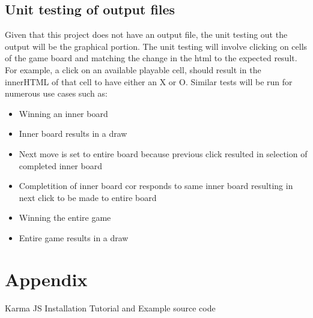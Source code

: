 \documentclass[12pt, titlepage]{article}
\begin{document}
\subsection{Unit testing of output files}		
Given that this project does not have an output file, the unit testing out the output will be the graphical portion. The unit testing will involve clicking on cells of the game board and matching the change in the html to the expected result. For example, a click on an available playable cell, should result in the innerHTML of that cell to have either an X or O. Similar tests will be run for numerous use cases such as:
\begin{itemize}
\item
Winning an inner board
\item
Inner board results in a draw
\item
Next move is set to entire board because previous click resulted in selection of completed inner board
\item
Completition of inner board cor	responds to same inner board resulting in next click to be made to entire board
\item
Winning the entire game
\item
Entire game results in a draw
\end{itemize}




\newpage

\section{Appendix}

Karma JS Installation Tutorial and Example source code~\citep{Karma}
\end{document}
